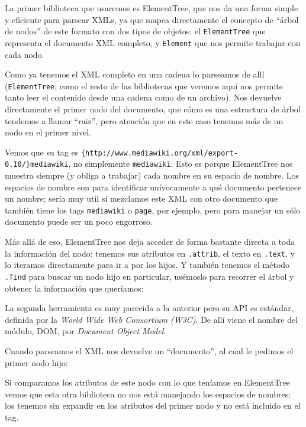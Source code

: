 La primer biblioteca que usaremos es ElementTree, que nos da una forma simple y eficiente para parsear XMLs, ya que mapea directamente el concepto de ``árbol de nodos'' de este formato con dos tipos de objetos: el \texttt{ElementTree} que representa el documento XML completo, y \texttt{Element} que nos permite trabajar con cada nodo.


Como ya tenemos el XML completo en una cadena lo parseamos de allí (\texttt{ElementTree}, como el resto de las bibliotecas que veremos aquí nos permite tanto leer el contenido desde una cadena como de un archivo). Nos devuelve directamente el primer nodo del documento, que cómo es una estructura de árbol tendemos a llamar ``raiz'', pero atención que en este caso tenemos más de un nodo en el primer nivel.

Vemos que su tag es \texttt{\{http://www.mediawiki.org/xml/export-0.10/\}mediawiki}, no simplemente \texttt{mediawiki}. Esto es porque ElementTree nos muestra siempre (y obliga a trabajar) cada nombre en su espacio de nombre. Los espacios de nombre son para identificar unívocamente a qué documento pertenece un nombre; sería muy util si mezclamos este XML con otro documento que también tiene los tags \texttt{mediawiki} o \texttt{page}, por ejemplo, pero para manejar un sólo documento puede ser un poco engorroso.

Más allá de eso, ElementTree nos deja acceder de forma bastante directa a toda la información del nodo: tenemos sus atributos en \texttt{.attrib}, el texto en \texttt{.text}, y lo iteramos directamente para ir a por los hijos. Y también tenemos el método \texttt{.find} para buscar un nodo hijo en particular, usémoslo para recorrer el árbol y obtener la información que queríamos:


La segunda herramienta es muy parecida a la anterior pero su API es estándar, definida por la \textit{World Wide Web Consortium (W3C)}. De allí viene el nombre del módulo, DOM, por \textit{Document Object Model}.

Cuando parseamos el XML nos devuelve un ``documento'', al cual le pedimos el primer nodo hijo:


Si comparamos los atributos de este nodo con lo que teníamos en ElementTree vemos que esta otra biblioteca no nos está manejando los espacios de nombres: los tenemos sin expandir en los atributos del primer nodo y no está incluido en el tag.

